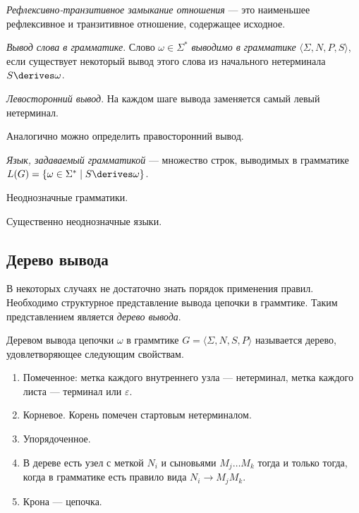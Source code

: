 \begin{definition}
  \textit{Рефлексивно-транзитивное замыкание отношения} --- это наименьшее рефлексивное и транзитивное отношение, содержащее исходное.
  \end{definition}

\begin{definition}
\textit{Вывод слова в грамматике}. Слово $\omega \in \Sigma^*$ \textit{выводимо в грамматике} $\langle \Sigma, N, P, S \rangle$, если существует некоторый вывод этого слова из начального нетерминала $S \derives \omega$.

\end{definition}

\begin{definition}
\textit{Левосторонний вывод}. На каждом шаге вывода заменяется самый левый нетерминал. 
\end{definition}

Аналогично можно определить правосторонний вывод.

\begin{definition}
\textit{Язык, задаваемый грамматикой} --- множество строк, выводимых в грамматике $L(G) = \{ \omega \in \Sigma^* \mid S \derives \omega \}$.
\end{definition}

Неоднозначные грамматики.

Существенно неоднозначные языки.


\subsection{Дерево вывода}
В некоторых случаях не достаточно знать порядок применения правил.
Необходимо структурное представление вывода цепочки в граммтике.
Таким представлением является \textit{дерево вывода}.
\begin{definition}
Деревом вывода цепочки $\omega$ в граммтике $G=\langle \Sigma, N, S, P \rangle$ называется дерево, удовлетворяющее следующим свойствам.

\begin{enumerate}
  \item Помеченное: метка каждого внутреннего узла --- нетерминал, метка каждого листа --- терминал или $\varepsilon$.
  \item Корневое. Корень помечен стартовым нетерминалом.
  \item Упорядоченное.
  \item В дереве есть узел с меткой $N_i$ и сыновьями $M_j \dots M_k$ тогда и только тогда, когда в грамматике есть правило вида $N_i \to M_j M_k$.
  \item Крона --- цепочка.
\end{enumerate}
\end{definition}

